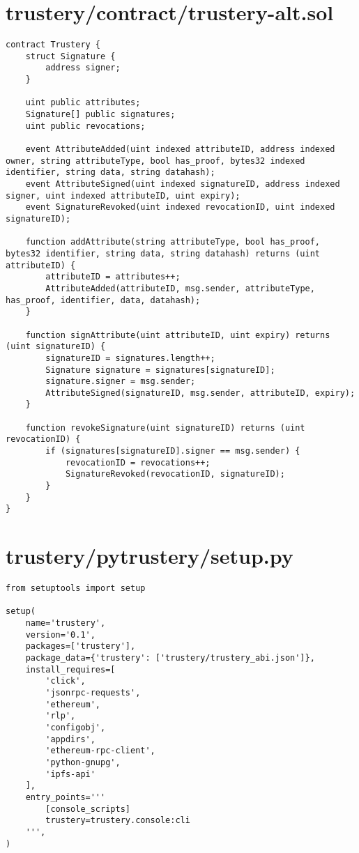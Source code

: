 \documentclass[12pt]{report}
\begin{document}
	\section{trustery/contract/trustery-alt.sol}
	\begin{lstlisting}
contract Trustery {
    struct Signature {
        address signer;
    }

    uint public attributes;
    Signature[] public signatures;
    uint public revocations;

    event AttributeAdded(uint indexed attributeID, address indexed owner, string attributeType, bool has_proof, bytes32 indexed identifier, string data, string datahash);
    event AttributeSigned(uint indexed signatureID, address indexed signer, uint indexed attributeID, uint expiry);
    event SignatureRevoked(uint indexed revocationID, uint indexed signatureID);

    function addAttribute(string attributeType, bool has_proof, bytes32 identifier, string data, string datahash) returns (uint attributeID) {
        attributeID = attributes++;
        AttributeAdded(attributeID, msg.sender, attributeType, has_proof, identifier, data, datahash);
    }

    function signAttribute(uint attributeID, uint expiry) returns (uint signatureID) {
        signatureID = signatures.length++;
        Signature signature = signatures[signatureID];
        signature.signer = msg.sender;
        AttributeSigned(signatureID, msg.sender, attributeID, expiry);
    }

    function revokeSignature(uint signatureID) returns (uint revocationID) {
        if (signatures[signatureID].signer == msg.sender) {
            revocationID = revocations++;
            SignatureRevoked(revocationID, signatureID);
        }
    }
}
	\end{lstlisting}
	
	\section{trustery/pytrustery/setup.py}
	\begin{lstlisting}
from setuptools import setup

setup(
    name='trustery',
    version='0.1',
    packages=['trustery'],
    package_data={'trustery': ['trustery/trustery_abi.json']},
    install_requires=[
        'click',
        'jsonrpc-requests',
        'ethereum',
        'rlp',
        'configobj',
        'appdirs',
        'ethereum-rpc-client',
        'python-gnupg',
        'ipfs-api'
    ],
    entry_points='''
        [console_scripts]
        trustery=trustery.console:cli
    ''',
)
	\end{lstlisting}
	
\end{document}
